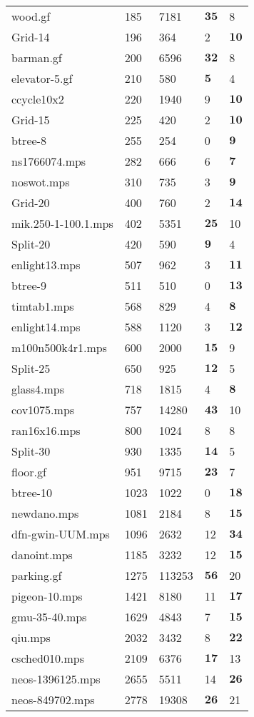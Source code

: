 \documentclass{article}
\begin{document}
\begin{longtable}{|l |l |l |l |l |}
wood.gf&185&7181&$\mathbf{35}$&8\\
Grid-14&196&364&2&$\mathbf{10}$\\
barman.gf&200&6596&$\mathbf{32}$&8\\
elevator-5.gf&210&580&$\mathbf{5}$&4\\
ccycle10x2&220&1940&9&$\mathbf{10}$\\
Grid-15&225&420&2&$\mathbf{10}$\\
btree-8&255&254&0&$\mathbf{9}$\\
ns1766074.mps&282&666&6&$\mathbf{7}$\\
noswot.mps&310&735&3&$\mathbf{9}$\\
Grid-20&400&760&2&$\mathbf{14}$\\
mik.250-1-100.1.mps&402&5351&$\mathbf{25}$&10\\
Split-20&420&590&$\mathbf{9}$&4\\
enlight13.mps&507&962&3&$\mathbf{11}$\\
btree-9&511&510&0&$\mathbf{13}$\\
timtab1.mps&568&829&4&$\mathbf{8}$\\
enlight14.mps&588&1120&3&$\mathbf{12}$\\
m100n500k4r1.mps&600&2000&$\mathbf{15}$&9\\
Split-25&650&925&$\mathbf{12}$&5\\
glass4.mps&718&1815&4&$\mathbf{8}$\\
cov1075.mps&757&14280&$\mathbf{43}$&10\\
ran16x16.mps&800&1024&8&8\\
Split-30&930&1335&$\mathbf{14}$&5\\
floor.gf&951&9715&$\mathbf{23}$&7\\
btree-10&1023&1022&0&$\mathbf{18}$\\
newdano.mps&1081&2184&8&$\mathbf{15}$\\
dfn-gwin-UUM.mps&1096&2632&12&$\mathbf{34}$\\
danoint.mps&1185&3232&12&$\mathbf{15}$\\
parking.gf&1275&113253&$\mathbf{56}$&20\\
pigeon-10.mps&1421&8180&11&$\mathbf{17}$\\
gmu-35-40.mps&1629&4843&7&$\mathbf{15}$\\
qiu.mps&2032&3432&8&$\mathbf{22}$\\
csched010.mps&2109&6376&$\mathbf{17}$&13\\
neos-1396125.mps&2655&5511&14&$\mathbf{26}$\\
neos-849702.mps&2778&19308&$\mathbf{26}$&21\\

\end{longtable}
\end{document}
